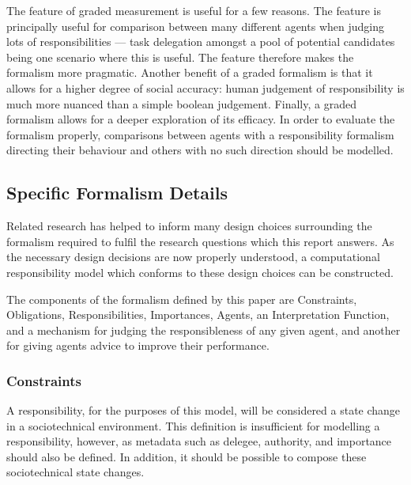 The feature of graded measurement is useful for a few reasons. The feature is principally useful for comparison between many different agents when judging lots of responsibilities --- task delegation amongst a pool of potential candidates being one scenario where this is useful. The feature therefore makes the formalism more pragmatic. Another benefit of a graded formalism is that it allows for a higher degree of social accuracy: human judgement of responsibility is much more nuanced than a simple boolean judgement. Finally, a graded formalism allows for a deeper exploration of its efficacy. In order to evaluate the formalism properly, comparisons between agents with a responsibility formalism directing their behaviour and others with no such direction should be modelled.\par

\subsection{Specific Formalism Details}

Related research has helped to inform many design choices surrounding the formalism required to fulfil the research questions which this report answers. As the necessary design decisions are now properly understood, a computational responsibility model which conforms to these design choices can be constructed.\par

The components of the formalism defined by this paper are Constraints, Obligations, Responsibilities, Importances, Agents, an Interpretation Function, and a mechanism for judging the responsibleness of any given agent, and another for giving agents advice to improve their performance.\par

\subsubsection{Constraints}  %
A responsibility, for the purposes of this model, will be considered a state change in a sociotechnical environment. This definition is insufficient for modelling a responsibility, however, as metadata such as delegee, authority, and importance should also be defined. In addition, it should be possible to compose these sociotechnical state changes.\par

